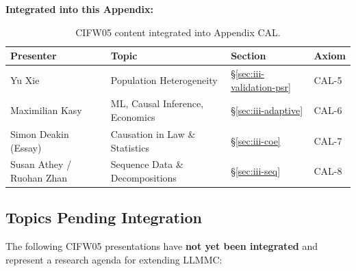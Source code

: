\textbf{Integrated into this Appendix:}

\begin{table}[h]
\centering
\begin{tabular}{llll}
\toprule
\textbf{Presenter} & \textbf{Topic} & \textbf{Section} & \textbf{Axiom} \\
\midrule
Yu Xie & Population Heterogeneity & \S\ref{sec:iii-validation-psr} & CAL-5 \\
Maximilian Kasy & ML, Causal Inference, Economics & \S\ref{sec:iii-adaptive} & CAL-6 \\
Simon Deakin (Essay) & Causation in Law \& Statistics & \S\ref{sec:iii-coe} & CAL-7 \\
Susan Athey / Ruohan Zhan & Sequence Data \& Decompositions & \S\ref{sec:iii-seq} & CAL-8 \\
\bottomrule
\end{tabular}
\caption{CIFW05 content integrated into Appendix CAL.}
\end{table}

\subsection{Topics Pending Integration}

The following CIFW05 presentations have \textbf{not yet been integrated} and represent
a research agenda for extending LLMMC:


